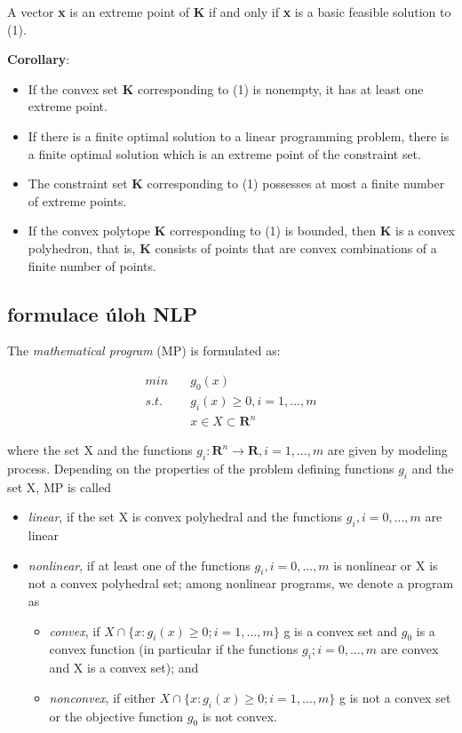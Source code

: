 \documentclass[a4]{report}
\theoremstyle{definition}
\begin{document}
A vector \textbf{x} is an extreme point of \textbf{K} if and only if \textbf{x} is a basic feasible solution
to (1).

\textbf{Corollary}:
\begin{itemize}
\item If the convex set \textbf{K} corresponding to (1) is nonempty, it has at
least one extreme point.
\item If there is a finite optimal solution to a linear programming
problem, there is a finite optimal solution which is an extreme point of the
constraint set.
\item The constraint set \textbf{K} corresponding to (1) possesses at most a
finite number of extreme points.
\item If the convex polytope \textbf{K} corresponding to (1) is bounded, then \textbf{K}
is a convex polyhedron, that is, \textbf{K} consists of points that are convex
combinations of a finite number of points.
\end{itemize}




\subsection{formulace úloh NLP}

The \textit{mathematical program} (MP) is formulated as:

\begin{align*}
min \quad&  g_{0}(x) \\
s.t.\quad &  g_{i}(x) \geq 0, i=1,...,m\\
&  x \in X \subset \mathbf{R}^{n}
\end{align*}

where the set X and the functions $g_{i}: \mathbf{R}^n \rightarrow \mathbf{R}, i=1,...,m$ are given by modeling process. Depending on the properties of the problem defining functions $g_{i}$ and the
set X, MP is called
\begin{itemize}
\item \textit{linear}, if the set X is convex polyhedral and the functions $g_{i}, i = 0,...,m$
are linear
\item \textit{nonlinear}, if at least one of the functions $g_{i}, i = 0,...,m$ is nonlinear or
X is not a convex polyhedral set; among nonlinear programs, we denote
a program as
\begin{itemize}
\item \textit{convex}, if $X \cap \{x: g_{i}(x) \geq  0; i = 1, ..., m\}$ g is a convex set and $g_{0}$ is
a convex function (in particular if the functions $g_{i}; i = 0, ..., m$ are
convex and X is a convex set); and
\item \textit{nonconvex}, if either $X \cap \{x: g_{i}(x) \geq  0; i = 1, ..., m\}$ g is not a convex
set or the objective function $g_{0}$ is not convex.
\end{itemize}
\end{itemize}
\end{document}
